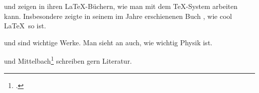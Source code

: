 \documentclass[12pt,ngerman,parskip=half]{scrarticle}
\begin{document}
\blindtext 


\cite{knuth} und \cite{Voss2017} zeigen in ihren \LaTeX-Büchern, wie man mit dem \TeX-System arbeiten kann. Insbesondere \citeauthor{Voss2017} zeigte in seinem im Jahre \citeyear{Voss2017} erschienenen Buch , wie cool \LaTeX\ so ist.

\blindtext \cite{Voss2017} und \cite{knuth} sind wichtige Werke. Man sieht an \cite{Aybas2021} auch, wie wichtig Physik ist.

\parencite{knuth} und Mittelbach\footcite{knuth} schreiben gern Literatur.



\printbibliography
\end{document}
